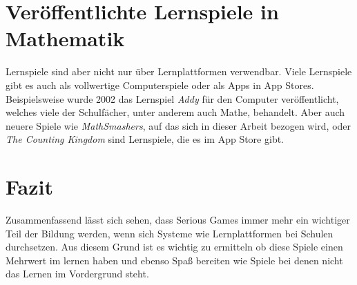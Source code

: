 \section{Veröffentlichte Lernspiele in Mathematik}
Lernspiele sind aber nicht nur über Lernplattformen verwendbar. Viele Lernspiele gibt es auch als vollwertige Computerspiele oder als Apps in App Stores. Beispielsweise wurde 2002 das Lernspiel \textit{Addy} für den Computer veröffentlicht, welches viele der Schulfächer, unter anderem auch Mathe, behandelt. Aber auch neuere Spiele wie \textit{MathSmashers}, auf das sich in dieser Arbeit bezogen wird, oder \textit{The Counting Kingdom} sind Lernspiele, die es im App Store gibt.
\section{Fazit}
Zusammenfassend lässt sich sehen, dass Serious Games immer mehr ein wichtiger Teil der Bildung werden, wenn sich Systeme wie Lernplattformen bei Schulen durchsetzen. Aus diesem Grund ist es wichtig zu ermitteln ob diese Spiele einen Mehrwert im lernen haben und ebenso Spaß bereiten wie Spiele bei denen nicht das Lernen im Vordergrund steht.